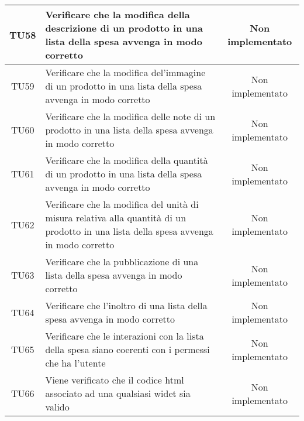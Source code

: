 \begin{center}
\begin{longtable}{|c|>{\centering}m{10cm}|c|}
		TU58 & Verificare che la modifica della descrizione di un prodotto in una lista della spesa avvenga in modo corretto & Non implementato \\ \hline
		TU59 & Verificare che la modifica del'immagine di un prodotto in una lista della spesa avvenga in modo corretto & Non implementato \\ \hline
		TU60 & Verificare che la modifica delle note di un prodotto in una lista della spesa avvenga in modo corretto & Non implementato \\ \hline
		TU61 & Verificare che la modifica della quantità di un prodotto in una lista della spesa avvenga in modo corretto & Non implementato \\ \hline
		TU62 & Verificare che la modifica del unità di misura relativa alla quantità di un prodotto in una lista della spesa avvenga in modo corretto & Non implementato \\ \hline
		TU63 & Verificare che la pubblicazione di una lista della spesa avvenga in modo corretto & Non implementato \\ \hline
		TU64 & Verificare che l'inoltro di una lista della spesa avvenga in modo corretto & Non implementato \\ \hline
		TU65 & Verificare che le interazioni con la lista della spesa siano coerenti con i permessi che ha l'utente & Non implementato \\ \hline
		TU66 & Viene verificato che il codice html associato ad una qualsiasi widet sia valido & Non implementato \\ \hline
	\end{longtable}
\end{center}
